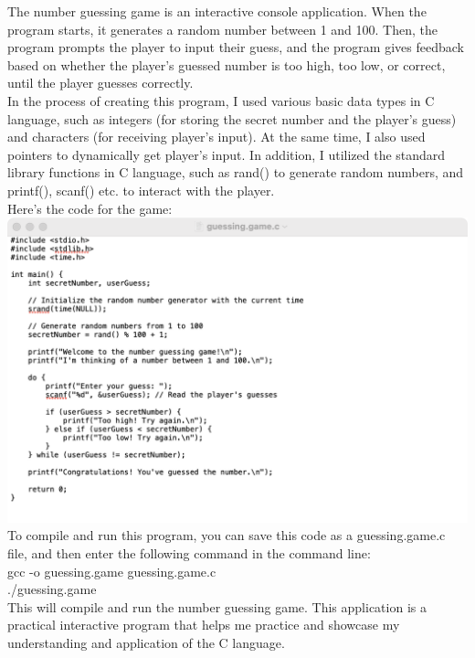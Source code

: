 \documentclass[a4paper, 11pt]{report}
\begin{document}
The number guessing game is an interactive console application. When the program starts, it generates a random number between 1 and 100. Then, the program prompts the player to input their guess, and the program gives feedback based on whether the player's guessed number is too high, too low, or correct, until the player guesses correctly.\\

In the process of creating this program, I used various basic data types in C language, such as integers (for storing the secret number and the player's guess) and characters (for receiving player's input). At the same time, I also used pointers to dynamically get player's input. In addition, I utilized the standard library functions in C language, such as rand() to generate random numbers, and printf(), scanf() etc. to interact with the player.\\

Here's the code for the game:\\

\includegraphics[width=1\linewidth]{guessing.game.jpeg}\\

To compile and run this program, you can save this code as a guessing.game.c file, and then enter the following command in the command line:\\

gcc -o guessing.game guessing.game.c\\
./guessing.game\\

This will compile and run the number guessing game. This application is a practical interactive program that helps me practice and showcase my understanding and application of the C language.
\end{document}

